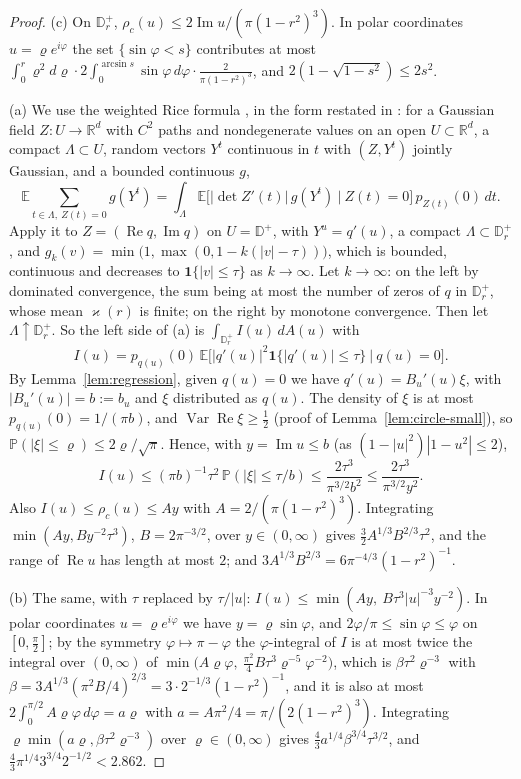 \documentclass[11pt]{amsart}
\theoremstyle{definition}
\theoremstyle{remark}
\numberwithin{equation}{section}
\newcommand{\R}{\mathbb{R}}
\newcommand{\D}{\mathbb{D}}
\newcommand{\E}{\mathbb{E}}
\newcommand{\PP}{\mathbb{P}}
\DeclareMathOperator{\re}{Re}
\DeclareMathOperator{\im}{Im}
\begin{document}
\begin{proof}
(c) On $\D_r^+$, $\rho_c(u)\le2\im u/(\pi(1-r^2)^3)$. In polar coordinates $u=\varrho e^{i\varphi}$ the set $\{\sin\varphi<s\}$ contributes at most $\int_0^r\varrho^2d\varrho\cdot2\int_0^{\arcsin s}\sin\varphi\,d\varphi\cdot\frac2{\pi(1-r^2)^3}$, and $2(1-\sqrt{1-s^2})\le2s^2$.

(a) We use the weighted Rice formula \cite[Theorem~6.4]{AW}, in the form restated in \cite[Appendix~A.1, Theorem~1]{LPR}: for a Gaussian field $Z:U\to\R^d$ with $C^2$ paths and nondegenerate values on an open $U\subset\R^d$, a compact $\Lambda\subset U$, random vectors $Y^t$ continuous in $t$ with $(Z,Y^t)$ jointly Gaussian, and a bounded continuous $g$,
\[
\E\sum_{t\in\Lambda,\ Z(t)=0}g(Y^t)=\int_\Lambda\E\bigl[|\det Z'(t)|\,g(Y^t)\ \big|\ Z(t)=0\bigr]\,p_{Z(t)}(0)\,dt .
\]
Apply it to $Z=(\re q,\im q)$ on $U=\D^+$, with $Y^u=q'(u)$, a compact $\Lambda\subset\D_r^+$, and $g_k(v)=\min\bigl(1,\max(0,1-k(|v|-\tau))\bigr)$, which is bounded, continuous and decreases to $\mathbf 1\{|v|\le\tau\}$ as $k\to\infty$. Let $k\to\infty$: on the left by dominated convergence, the sum being at most the number of zeros of $q$ in $\D_r^+$, whose mean $\varkappa(r)$ is finite; on the right by monotone convergence. Then let $\Lambda\uparrow\D_r^+$. So the left side of (a) is $\int_{\D_r^+}I(u)\,dA(u)$ with
\[
I(u)=p_{q(u)}(0)\,\E\bigl[|q'(u)|^2\mathbf 1\{|q'(u)|\le\tau\}\ \big|\ q(u)=0\bigr].
\]
By Lemma~\ref{lem:regression}, given $q(u)=0$ we have $q'(u)=B_u'(u)\xi$, with $|B_u'(u)|=b:=b_u$ and $\xi$ distributed as $q(u)$. The density of $\xi$ is at most $p_{q(u)}(0)=1/(\pi b)$, and $\operatorname{Var}\re\xi\ge\frac12$ (proof of Lemma~\ref{lem:circle-small}), so $\PP(|\xi|\le\varrho)\le2\varrho/\sqrt\pi$. Hence, with $y=\im u\le b$ (as $(1-|u|^2)|1-u^2|\le2$),
\[
I(u)\le(\pi b)^{-1}\tau^2\,\PP(|\xi|\le\tau/b)\le\frac{2\tau^3}{\pi^{3/2}b^2}\le\frac{2\tau^3}{\pi^{3/2}y^2}.
\]
Also $I(u)\le\rho_c(u)\le Ay$ with $A=2/(\pi(1-r^2)^3)$. Integrating $\min(Ay,By^{-2}\tau^3)$, $B=2\pi^{-3/2}$, over $y\in(0,\infty)$ gives $\frac32A^{1/3}B^{2/3}\tau^2$, and the range of $\re u$ has length at most $2$; and $3A^{1/3}B^{2/3}=6\pi^{-4/3}(1-r^2)^{-1}$.

(b) The same, with $\tau$ replaced by $\tau/|u|$: $I(u)\le\min(Ay,\ B\tau^3|u|^{-3}y^{-2})$. In polar coordinates $u=\varrho e^{i\varphi}$ we have $y=\varrho\sin\varphi$, and $2\varphi/\pi\le\sin\varphi\le\varphi$ on $[0,\frac\pi2]$; by the symmetry $\varphi\mapsto\pi-\varphi$ the $\varphi$-integral of $I$ is at most twice the integral over $(0,\infty)$ of $\min\bigl(A\varrho\varphi,\ \frac{\pi^2}4B\tau^3\varrho^{-5}\varphi^{-2}\bigr)$, which is $\beta\tau^2\varrho^{-3}$ with $\beta=3A^{1/3}(\pi^2B/4)^{2/3}=3\cdot2^{-1/3}(1-r^2)^{-1}$, and it is also at most $2\int_0^{\pi/2}A\varrho\varphi\,d\varphi=a\varrho$ with $a=A\pi^2/4=\pi/(2(1-r^2)^3)$. Integrating $\varrho\min(a\varrho,\beta\tau^2\varrho^{-3})$ over $\varrho\in(0,\infty)$ gives $\frac43a^{1/4}\beta^{3/4}\tau^{3/2}$, and $\frac43\pi^{1/4}3^{3/4}2^{-1/2}<2.862$.


\end{proof}
\end{document}
